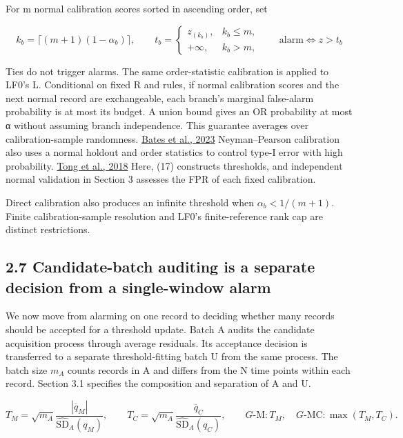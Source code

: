 \documentclass[10pt,a4paper]{article}
\begin{document}
For m normal calibration scores sorted in ascending order, set

\begin{equation}
k_b=\lceil(m+1)(1-\alpha_b)\rceil,\qquad
t_b=\begin{cases}z_{(k_b)},&k_b\leq m,\\+\infty,&k_b>m,\end{cases}
\qquad \mathrm{alarm}\iff z>t_b
\tag{17}
\end{equation}

Ties do not trigger alarms. The same order-statistic calibration is applied to LF0's L. Conditional on fixed R and rules, if normal calibration scores and the next normal record are exchangeable, each branch's marginal false-alarm probability is at most its budget. A union bound gives an OR probability at most α without assuming branch independence. This guarantee averages over calibration-sample randomness. \href{https://doi.org/10.1214/22-AOS2244}{Bates et al., 2023} Neyman–Pearson calibration also uses a normal holdout and order statistics to control type-I error with high probability. \href{https://doi.org/10.1126/sciadv.aao1659}{Tong et al., 2018} Here, (17) constructs thresholds, and independent normal validation in Section 3 assesses the FPR of each fixed calibration.

Direct calibration also produces an infinite threshold when \(\alpha_b<1/(m+1)\). Finite calibration-sample resolution and LF0's finite-reference rank cap are distinct restrictions.

\subsection{2.7 Candidate-batch auditing is a separate decision from a single-window alarm}

We now move from alarming on one record to deciding whether many records should be accepted for a threshold update. Batch A audits the candidate acquisition process through average residuals. Its acceptance decision is transferred to a separate threshold-fitting batch U from the same process. The batch size \(m_A\) counts records in A and differs from the N time points within each record. Section 3.1 specifies the composition and separation of A and U.

\begin{equation}
T_M=\sqrt{m_A}\frac{|\overline q_M|}{\widehat{\mathrm{SD}}_A(q_M)},\qquad
T_C=\sqrt{m_A}\frac{\overline q_C}{\widehat{\mathrm{SD}}_A(q_C)},\qquad
G\text{-M}:T_M,\quad G\text{-MC}:\max(T_M,T_C).
\tag{18}
\end{equation}
\end{document}
